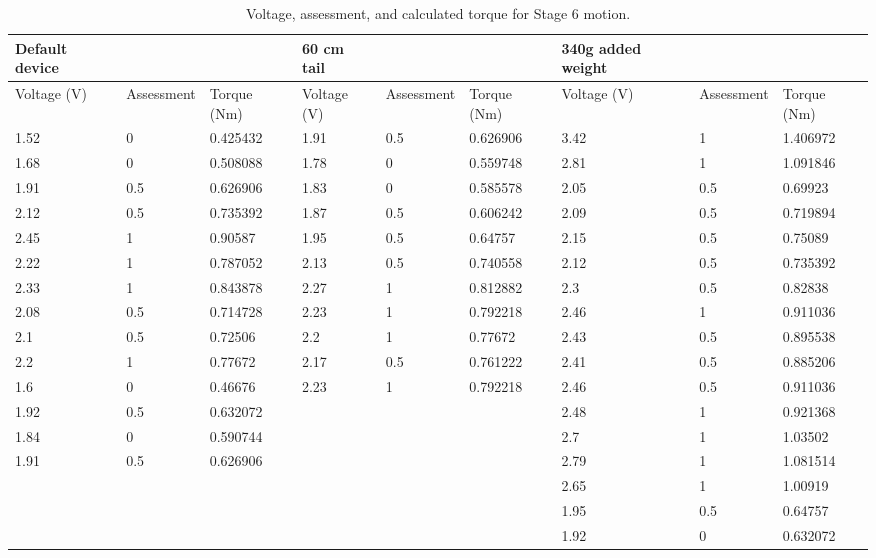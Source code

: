 \begin{landscape}
\begin{table}[!ht]
	\centering
	\caption{Voltage, assessment, and calculated torque for Stage 6 motion.}
	\footnotesize
	\begin{tabular}{|l|l|l|l|l|l|l|l|l|}
		\hline
		Default device & ~ & ~ & 60 cm tail & ~ & ~ & 340g added weight & ~ & ~ \\ \hline
		Voltage (V) & Assessment & Torque (Nm) & Voltage (V) & Assessment & Torque (Nm) & Voltage (V) & Assessment & Torque (Nm) \\ \hline
		1.52 & 0 & 0.425432 & 1.91 & 0.5 & 0.626906 & 3.42 & 1 & 1.406972 \\ \hline
		1.68 & 0 & 0.508088 & 1.78 & 0 & 0.559748 & 2.81 & 1 & 1.091846 \\ \hline
		1.91 & 0.5 & 0.626906 & 1.83 & 0 & 0.585578 & 2.05 & 0.5 & 0.69923 \\ \hline
		2.12 & 0.5 & 0.735392 & 1.87 & 0.5 & 0.606242 & 2.09 & 0.5 & 0.719894 \\ \hline
		2.45 & 1 & 0.90587 & 1.95 & 0.5 & 0.64757 & 2.15 & 0.5 & 0.75089 \\ \hline
		2.22 & 1 & 0.787052 & 2.13 & 0.5 & 0.740558 & 2.12 & 0.5 & 0.735392 \\ \hline
		2.33 & 1 & 0.843878 & 2.27 & 1 & 0.812882 & 2.3 & 0.5 & 0.82838 \\ \hline
		2.08 & 0.5 & 0.714728 & 2.23 & 1 & 0.792218 & 2.46 & 1 & 0.911036 \\ \hline
		2.1 & 0.5 & 0.72506 & 2.2 & 1 & 0.77672 & 2.43 & 0.5 & 0.895538 \\ \hline
		2.2 & 1 & 0.77672 & 2.17 & 0.5 & 0.761222 & 2.41 & 0.5 & 0.885206 \\ \hline
		1.6 & 0 & 0.46676 & 2.23 & 1 & 0.792218 & 2.46 & 0.5 & 0.911036 \\ \hline
		1.92 & 0.5 & 0.632072 & ~ & ~ & ~ & 2.48 & 1 & 0.921368 \\ \hline
		1.84 & 0 & 0.590744 & ~ & ~ & ~ & 2.7 & 1 & 1.03502 \\ \hline
		1.91 & 0.5 & 0.626906 & ~ & ~ & ~ & 2.79 & 1 & 1.081514 \\ \hline
		~ & ~ & ~ & ~ & ~ & ~ & 2.65 & 1 & 1.00919 \\ \hline
		~ & ~ & ~ & ~ & ~ & ~ & 1.95 & 0.5 & 0.64757 \\ \hline
		~ & ~ & ~ & ~ & ~ & ~ & 1.92 & 0 & 0.632072 \\ \hline
	\end{tabular}
\end{table}

\end{landscape}